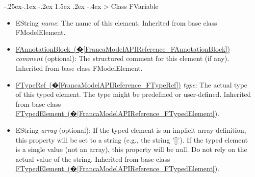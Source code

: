 \documentclass[a4paper,10pt]{scrreprt}
\makeatletter
\renewcommand\subsection{\medskip\@startsection{subsection}{2}{\z@}%
  {-.25ex\@plus -.1ex \@minus -.2ex}%
  {1.5ex \@plus .2ex \@minus -.4ex}%
  {\ifnum \scr@compatibility>\@nameuse{scr@v@2.96}\relax
    \setlength{\parfillskip}{\z@ plus 1fil}\fi
    \raggedsection\normalfont\sectfont\nobreak\size@subsection
  }%
}
\newlength{\XdocItemIndent}
\makeatother
\begin{document}
\subsection{Class FVariable}
\label{FrancaModelAPIReference_FVariable}
\setlength{\XdocItemIndent}{\textwidth}
\begin{itemize}
\addtolength{\XdocItemIndent}{-2.5em}
\item \begin{minipage}[t]{\XdocItemIndent}
EString \textit{name}: The name of this element.
		 Inherited from base class FModelElement.

\end{minipage}
\item \begin{minipage}[t]{\XdocItemIndent}
\hyperref[FrancaModelAPIReference_FAnnotationBlock]{FAnnotationBlock~(�\ref*{FrancaModelAPIReference_FAnnotationBlock})} \textit{comment} (optional): The structured comment for this element (if any).
		 Inherited from base class FModelElement.

\end{minipage}
\item \begin{minipage}[t]{\XdocItemIndent}
\hyperref[FrancaModelAPIReference_FTypeRef]{FTypeRef~(�\ref*{FrancaModelAPIReference_FTypeRef})} \textit{type}: The actual type of this typed element. The type might be predefined or user-defined.
		 Inherited from base class \hyperref[FrancaModelAPIReference_FTypedElement]{FTypedElement~(�\ref*{FrancaModelAPIReference_FTypedElement})}.

\end{minipage}
\item \begin{minipage}[t]{\XdocItemIndent}
EString \textit{array} (optional): If the typed element is an implicit array definition, this property will be set to a string (e.g., the string '[]'). If the typed element is a single value (not an array), this property will be null. Do not rely on the actual value of the string.
		 Inherited from base class \hyperref[FrancaModelAPIReference_FTypedElement]{FTypedElement~(�\ref*{FrancaModelAPIReference_FTypedElement})}.

\end{minipage}
\end{itemize}
\addtolength{\XdocItemIndent}{2.5em}
\end{document}
